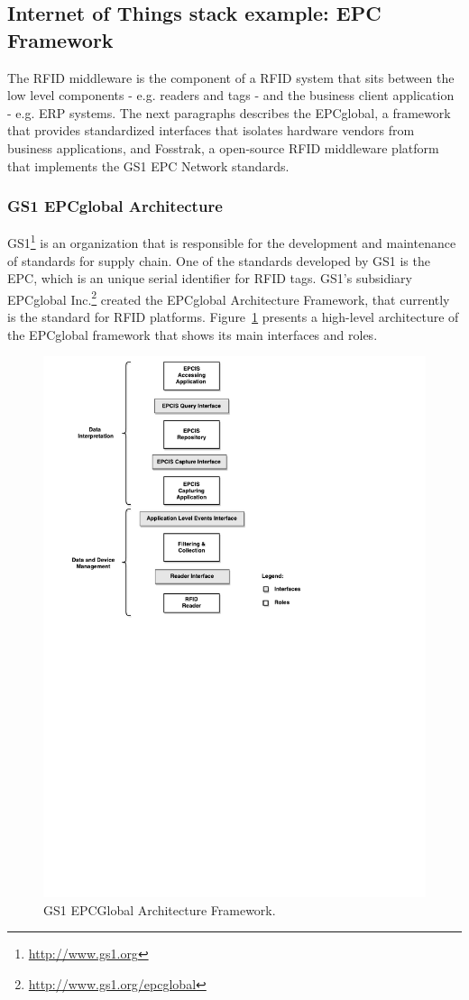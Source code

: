 \subsection{Internet of Things stack example: EPC Framework}
\label{subs:iot_stack}
The \gls{RFID} middleware is the component of a \gls{RFID} system that sits between the low level
components - e.g. readers and tags - and the business client application - e.g. \gls{ERP} systems.
The next paragraphs describes the EPCglobal, a framework that provides standardized interfaces that
isolates hardware vendors from business applications, and Fosstrak, a open-source \gls{RFID}
middleware platform that implements the GS1 \gls{EPC} Network standards.

\subsubsection{GS1 EPCglobal Architecture}
\label{subs:epc_network}
GS1\footnote{\url{http://www.gs1.org}} is an organization that is responsible for the development and
maintenance of standards for supply chain. One of the standards developed by GS1 is the \gls{EPC},
which is an unique serial identifier for \gls{RFID} tags. GS1's subsidiary EPCglobal Inc.\footnote{\url{http://www.gs1.org/epcglobal}} created
the EPCglobal Architecture Framework, that currently is the standard for \gls{RFID} platforms.
Figure~\ref{fig:epc_architecture} presents a high-level architecture of the EPCglobal framework
that shows its main interfaces and roles.\\

\begin{figure}[ht!]
  \centering
  \includegraphics[width=.7\textwidth]{./images/EPCGlobal_architecture}
  \caption[EPCGlobal Architecture Framework.]{GS1 EPCGlobal Architecture Framework.}
  \label{fig:epc_architecture}
\end{figure}

